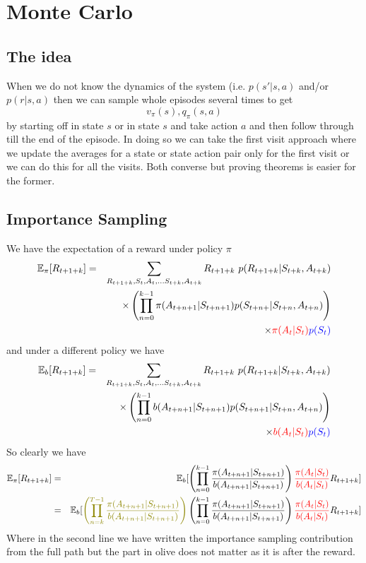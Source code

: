 \documentclass[11pt,a4paper]{article}
\newcommand\be{\begin{equation}}
\newcommand\bea{\begin{eqnarray}}
\newcommand\ee{\end{equation}}
\newcommand\eea{\end{eqnarray}}
\newcommand{\nn}{\nonumber \\}
\begin{document}
\section{Monte Carlo}

\subsection{The idea}

When we do not know the dynamics of the system (i.e. $p(s'|s,a)$ and/or $p(r|s,a)$ then we can sample whole episodes several times to get
\be
v_\pi(s), q_\pi(s,a)
\ee 
by starting off in state $s$ or in state $s$ and take action $a$ and then follow through till the end of the episode. In doing so we can take the first visit approach where we update the averages for a state or state action pair only for the first visit or we can do this for all the visits. Both converse but proving theorems is easier for the former.

\subsection{Importance Sampling}

We have the expectation of a reward under policy $\pi$ 
\bea
\mathbb E_{\pi}[R_{t+1+k}] &=& \sum_{R_{t+1+k}, S_t,A_t, \dots S_{t+k}, A_{t+k}} R_{t+1+k} ~ p(R_{t+1+k}| S_{t+k},A_{t+k}) \nn
&& \times \left( \prod_{n=0}^{k-1} \pi(A_{t+n+1} | S_{t+n+1} ) p( S_{t+n+} | S_{t+n}, A_{t+n}) \right) \nn
&&\times \color{red}{\pi(A_t|S_t)} \color{blue}{p(S_t)} 
\eea
and under a different policy we have
\bea
\mathbb E_{b}[R_{t+1+k}] &=& \sum_{R_{t+1+k}, S_t,A_t, \dots S_{t+k}, A_{t+k}} R_{t+1+k} ~ p(R_{t+1+k}| S_{t+k},A_{t+k}) \nn
&& \times \left( \prod_{n=0}^{k-1} b(A_{t+n+1} | S_{t+n+1} ) p( S_{t+n+1} | S_{t+n}, A_{t+n}) \right) \nn
&&\times \color{red}{b(A_t|S_t)} \color{blue}{p(S_t)} 
\eea
So clearly we have
\bea
\mathbb E_{\pi}[R_{t+1+k}] &=& \mathbb E_{b}[ \left( \prod_{n=0}^{k-1} \frac{\pi(A_{t+n+1} | S_{t+n+1} )}{b(A_{t+n+1} | S_{t+n+1} )} \right) {\color{red}\frac{\pi(A_{t} | S_{t} )}{b(A_{t} | S_{t} )}}   R_{t+1+k}]  \nn
&=&  \mathbb E_{b}[ {\color{olive} \left( \prod_{n=k}^{T-1} \frac{\pi(A_{t+n+1} | S_{t+n+1} )}{b(A_{t+n+1} | S_{t+n+1} )} \right)} \left( \prod_{n=0}^{k-1} \frac{\pi(A_{t+n+1} | S_{t+n+1} )}{b(A_{t+n+1} | S_{t+n+1} )} \right) {\color{red}\frac{\pi(A_{t} | S_{t} )}{b(A_{t} | S_{t} )}}   R_{t+1+k}]  \nn
\eea
Where in the second line we have written the importance sampling contribution from the full path but the part in olive does not matter as it is after the reward. 
\end{document}
